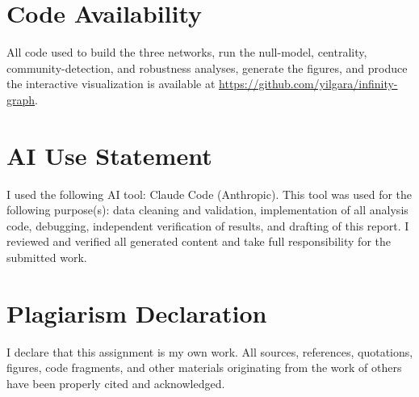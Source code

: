 \documentclass[11pt]{article}
\begin{document}
\section*{Code Availability}

All code used to build the three networks, run the null-model, centrality, community-detection, and robustness analyses, generate the figures, and produce the interactive visualization is available at \url{https://github.com/yilgara/infinity-graph}.

\section*{AI Use Statement}

I used the following AI tool: Claude Code (Anthropic). This tool was used for the following purpose(s): data cleaning and validation, implementation of all analysis code, debugging, independent verification of results, and drafting of this report. I reviewed and verified all generated content and take full responsibility for the submitted work.

\section*{Plagiarism Declaration}

I declare that this assignment is my own work. All sources,
references, quotations, figures, code fragments, and other materials originating from the work
of others have been properly cited and acknowledged.
\end{document}
